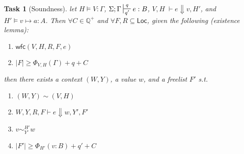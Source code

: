 \documentclass[11pt]{article}
\newcounter{group}
\newtheorem{theorem}{Task}[group]
\newcommand{\ms}[1]{\ensuremath{\mathsf{#1}}}
\newcommand{\wfc}[5]{\mathsf{wfc}(#1,#2,#3,#4,#5)}
\newcommand{\veq}[4]{#3 \sim^{#1}_{#2} #4}
\newcommand{\ctxeq}[2]{(#1) \sim (#2)}
\theoremstyle{definition}
\begin{document}
\begin{theorem}[Soundness]
\label{b} let $H \vDash V : \Gamma$, $\Sigma; \Gamma \sststile{q'}{q} e : B$,
$V,H \; \vdash e \Downarrow v, H'$, and $H' \vDash v \mapsto a : A$.
Then $\forall C \in \mathbb{Q}^{+}$ and $\forall F,R \subseteq \ms{Loc}$,
given the following (existence lemma):
\begin{enumerate} 
\item $\wfc{V}{H}{R}{F}{e}$
\item $|F| \ge \Phi_{V,H}(\Gamma) + q + C$ 
\end{enumerate}
then there exists a context $(W,Y)$, a value $w$, and a freelist $F'$ s.t.
\begin{enumerate}
	\item $\ctxeq{W,Y}{V,H}$
  \item $W,Y,R,F \vdash e \Downarrow w, Y', F'$
	\item $\veq{H'}{Y'}{v}{w}$
  \item $|F'| \ge \Phi_{H'}(v:B) + q' + C$
\end{enumerate}
\end{theorem}
\end{document}

